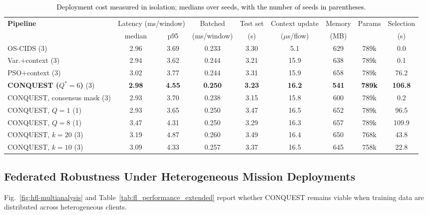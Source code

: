 \documentclass[conference]{IEEEtran}
\begin{document}
\begin{table}[!t]
\centering
\caption{\textcolor{black}{Deployment cost measured in isolation; medians over seeds, with the number of seeds in parentheses.}}
\label{tab:latency_profile_qcids}
\setlength{\tabcolsep}{4pt}
\begin{tabular}{lcccccccc}
\hline\toprule
\textbf{Pipeline} & \multicolumn{2}{c}{Latency (ms/window)} & Batched & Test set & Context update & Memory & Params & Selection \\
 & median & p95 & (ms/window) & (s) & ($\mu$s/flow) & (MB) & & (s) \\
\hline\toprule
OS-CIDS (3) & 2.96 & 3.69 & 0.233 & 3.30 & 5.1 & 629 & 789k & 0.0 \\
Var.+context (3) & 2.94 & 3.62 & 0.244 & 3.21 & 15.9 & 638 & 789k & 0.1 \\
PSO+context (3) & 3.02 & 3.77 & 0.244 & 3.31 & 15.9 & 658 & 789k & 76.2 \\
\textbf{CONQUEST ($Q^{*}{=}6$)} (3) & \textbf{2.98} & \textbf{4.55} & \textbf{0.250} & \textbf{3.23} & \textbf{16.2} & \textbf{541} & \textbf{789k} & \textbf{106.8} \\
CONQUEST, consensus mask (3) & 2.93 & 3.70 & 0.238 & 3.15 & 15.8 & 600 & 789k & 0.2 \\
CONQUEST, $Q{=}1$ (1) & 2.93 & 3.65 & 0.250 & 3.47 & 16.5 & 652 & 789k & 96.5 \\
CONQUEST, $Q{=}8$ (1) & 3.47 & 4.31 & 0.250 & 3.29 & 16.3 & 657 & 789k & 109.9 \\
CONQUEST, $k{=}20$ (3) & 3.19 & 4.87 & 0.260 & 3.49 & 16.4 & 650 & 768k & 43.8 \\
CONQUEST, $k{=}10$ (3) & 3.09 & 4.33 & 0.257 & 3.37 & 16.5 & 645 & 758k & 22.8 \\
\hline\toprule
\end{tabular}
\end{table}


\subsection{Federated Robustness Under Heterogeneous Mission Deployments}
\label{subsec:obj3_heterogeneity}
Fig.~\ref{fig:hfl-multianalysis} and
Table~\ref{tab:fl_performance_extended} report whether CONQUEST
remains viable when training data are distributed across
heterogeneous clients.
\end{document}
